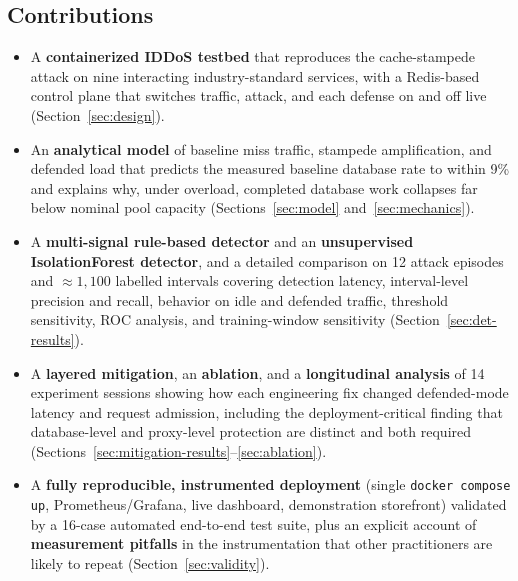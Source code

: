 \documentclass[preprint,12pt]{elsarticle}
\begin{document}
\subsection{Contributions}
\begin{itemize}[leftmargin=*]
\item A \textbf{containerized IDDoS testbed} that reproduces the cache-stampede attack
on nine interacting industry-standard services, with a Redis-based control plane that
switches traffic, attack, and each defense on and off live
(Section~\ref{sec:design}).
\item An \textbf{analytical model} of baseline miss traffic, stampede amplification,
and defended load that predicts the measured baseline database rate to within 9\%
and explains why, under overload, completed database work collapses far below
nominal pool capacity (Sections~\ref{sec:model} and~\ref{sec:mechanics}).
\item A \textbf{multi-signal rule-based detector} and an \textbf{unsupervised
IsolationForest detector}, and a detailed comparison on 12 attack episodes and
${\approx}1{,}100$ labelled intervals covering detection latency, interval-level
precision and recall, behavior on idle and defended traffic, threshold sensitivity,
ROC analysis, and training-window sensitivity (Section~\ref{sec:det-results}).
\item A \textbf{layered mitigation}, an \textbf{ablation}, and a \textbf{longitudinal
analysis} of 14 experiment sessions showing how each engineering fix changed
defended-mode latency and request admission, including the deployment-critical
finding that database-level and proxy-level protection are distinct and both
required (Sections~\ref{sec:mitigation-results}--\ref{sec:ablation}).
\item A \textbf{fully reproducible, instrumented deployment} (single
\texttt{docker compose up}, Prometheus/Grafana, live dashboard, demonstration
storefront) validated by a 16-case automated end-to-end test suite, plus an explicit
account of \textbf{measurement pitfalls} in the instrumentation that other
practitioners are likely to repeat (Section~\ref{sec:validity}).
\end{itemize}
\end{document}
